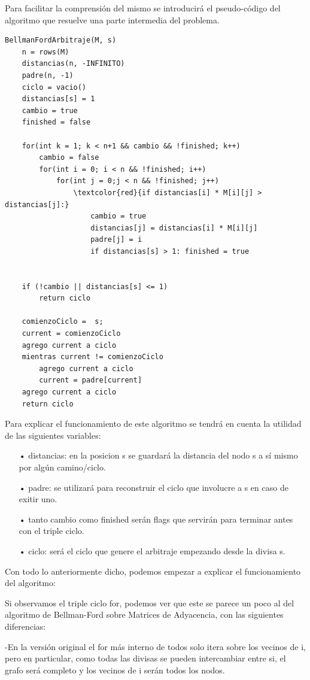 \documentclass[11pt,a4paper]{article}
\begin{document}
Para facilitar la comprensi\'on del mismo se introducir\'a el pseudo-c\'odigo del algoritmo que resuelve una parte intermedia del problema.
\begin{Verbatim}[commandchars=\\\{\}]
BellmanFordArbitraje(M, s)
    n = rows(M)
    distancias(n, -INFINITO)
    padre(n, -1)
    ciclo = vacio()
    distancias[s] = 1
    cambio = true
    finished = false
    
    for(int k = 1; k < n+1 && cambio && !finished; k++)
        cambio = false
        for(int i = 0; i < n && !finished; i++)
            for(int j = 0;j < n && !finished; j++)
                \textcolor{red}{if distancias[i] * M[i][j] > distancias[j]:}
                    cambio = true
                    distancias[j] = distancias[i] * M[i][j]
                    padre[j] = i
                    if distancias[s] > 1: finished = true
                
            
    if (!cambio || distancias[s] <= 1)
        return ciclo

    comienzoCiclo =  s;
    current = comienzoCiclo
    agrego current a ciclo
    mientras current != comienzoCiclo
        agrego current a ciclo
        current = padre[current]
    agrego current a ciclo
    return ciclo
\end{Verbatim} 

Para explicar el funcionamiento de este algoritmo se tendr\'a en cuenta la utilidad de las siguientes variables:
\begin{itemize}
    \item[•] distancias: en la posicion s se guardar\'a la distancia del nodo s a s\'i mismo por alg\'un camino/ciclo.
    \item[•] padre: se utilizar\'a para reconstruir el ciclo que involucre a s en caso de exitir uno.
    \item[•] tanto cambio como finished ser\'an flags que servir\'an para terminar antes con el triple ciclo.
    \item[•] ciclo: ser\'a el ciclo que genere el arbitraje empezando desde la divisa s.
\end{itemize}
Con todo lo anteriormente dicho, podemos empezar a explicar el funcionamiento del algoritmo:

Si observamos el triple ciclo for, podemos ver que este se parece un poco al del algoritmo de Bellman-Ford sobre Matrices de Adyacencia, con las siguientes diferencias:

-En la versi\'on original el for m\'as interno de todos solo itera sobre los vecinos de i, pero en particular, como todas las divisas se pueden intercambiar entre si, el grafo ser\'a completo y los vecinos de i ser\'an todos los nodos.
\end{document}
